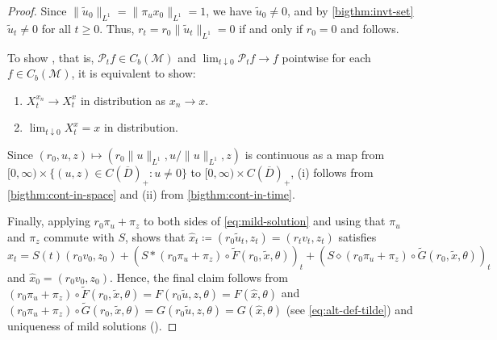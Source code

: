\documentclass[final]{amsart}
\numberwithin{thm}{section}
\numberwithin{equation}{section}
\newcommand{\mcM}{\mathcal{M}}
\newcommand{\Pp}{\mathcal{P}}
\newcommand{\cdom}{C(\overline D)_+}
\begin{document}
\begin{proof}
Since $\|\tilde{u}_0\|_{L^1} = \|\pi_{u}x_0\|_{L^1} = 1$, we have 
$\tilde{u}_0 \neq 0$, and by \ref{bigthm:invt-set} 
$\tilde{u}_t \neq 0$ for all $t \geq 0$. Thus, $r_t = r_0\|\tilde{u}_t\|_{L^1} = 0$  if and only if $r_0 = 0$ and 
 follows. 

    To show , that is, $\Pp_tf \in C_b(\mcM)$ and $\lim_{t \downarrow 0}\Pp_tf \to f$ pointwise for each $f \in C_b(\mcM)$, it is equivalent to show: 
    \begin{enumerate}[label=(\roman*)]
        \item $X_t^{x_n} \to X_t^x$ in distribution
    as $x_n \to x$.
    \item $\lim_{t \downarrow 0} X_t^x = x$ in distribution.
    \end{enumerate}
     Since $(r_0,u,z) \mapsto (r_0\|u\|_{L^1}, u/\|u\|_{L^1},z)$ is continuous as a map from 
     $[0,\infty) \times \{(u, z) \in \cdom : u \neq 0\}$ to $[0,\infty) \times \cdom$, (i) follows from \ref{bigthm:cont-in-space} and (ii) from \ref{bigthm:cont-in-time}.


    Finally, 
    applying $r_0\pi_u + \pi_z$ to both sides of \eqref{eq:mild-solution} and using that $\pi_u$ and $\pi_z$ commute with $S$,  shows that $\hat x_t \coloneqq (r_0 \tilde{u}_t,z_t) = (r_tv_t,z_t)$ satisfies
    $$
    \hat x_t = S(t)(r_0v_0,z_0) + (S * (r_0\pi_u + \pi_z)\circ\tilde F(r_0,\tilde x,\theta))_t + (S \diamond (r_0\pi_u + \pi_z)\circ\tilde G(r_0, \tilde x,\theta))_t 
    $$
    and $\hat x_0 = (r_0 v_0, z_0)$. 
    Hence,  the final claim follows from $(r_0\pi_u + \pi_z)\circ \tilde F(r_0,\tilde{x},\theta) = F(r_0 \tilde{u},z,\theta) = F(\hat x, \theta)$ and $(r_0\pi_u + \pi_z)\circ\tilde G(r_0, \tilde{x},\theta) = G(r_0 \tilde{u}, z,\theta) = G(\hat x, \theta)$ (see \eqref{eq:alt-def-tilde}) and uniqueness of mild solutions ().
\end{proof}
\end{document}
